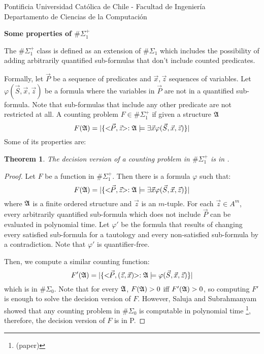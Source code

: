 \documentclass[12pt]{article}
\def\A{{\frak A}}
\newtheorem{theo}{Theorem}
\begin{document}
\begin{flushleft}
{\footnotesize Pontificia Universidad Cat\'olica de Chile - Facultad de Ingenier\'ia\\
Departamento de Ciencias de la Computaci\'on\\
}
\end{flushleft}
\begin{center}
{ \LARGE \bf
  Some properties of $\#\Sigma_1^{+}$
}
\end{center}

The $\#\Sigma_1^{+}$ class is defined as an extension of $\#\Sigma_1$ which includes the possibility of adding arbitrarily quantified sub-formulas that don't include counted predicates.

Formally, let $\vec{P}$ be a sequence of predicates and $\vec{x},\vec{z}$ sequences of variables. Let $\varphi(\vec{S},\vec{x},\vec{z})$ be a formula where the variables in $\vec{P}$ are not in a quantified sub-formula. Note that sub-formulas that include any other predicate are not restricted at all. A counting problem $F \in \#\Sigma_1^{+}$ if given a structure $\A$
$$
F(\A) = \vert \{ <\!\!\vec{P},\vec{z}\!\!> :\A \models \exists \vec{x} \varphi(\vec{S},\vec{x},\vec{z}) \} \vert
$$ 
Some of its properties are:

\begin{theo}
The decision version of a counting problem in $\#\Sigma_1^{+}$ is in .
\end{theo}
\begin{proof}
Let $F$ be a function in $\#\Sigma_1^{+}$. Then there is a formula $\varphi$ such that:
$$
F(\A) = \vert \{ <\!\!\vec{P},\vec{z}\!\!> :\A \models \exists \vec{x} \varphi(\vec{S},\vec{x},\vec{z}) \} \vert
$$ 
where $\A$ is a finite ordered structure and $\vec{z}$ is an $m$-tuple. For each $\vec{z} \in A^m$, every arbitrarily quantified sub-formula which does not include $\vec{P}$ can be evaluated in polynomial time. Let $\varphi'$ be the formula that results of changing every satisfied sub-formula for a tautology and every non-satisfied sub-formula by a contradiction. Note that $\varphi'$ is quantifier-free.

Then, we compute a similar counting function:
$$
F'(\A) = \vert \{ <\!\!\vec{P},(\vec{z},\vec{x})\!\!> :\A \models \varphi(\vec{S},\vec{x},\vec{z}) \} \vert
$$ 
which is in $\#\Sigma_0$. Note that for every $\A$, $F(\A) > 0$ iff $F'(\A) > 0$, so computing $F'$ is enough to solve the decision version of $F$. However, Saluja and Subrahmanyam showed that any counting problem in $\#\Sigma_0$ is computable in polynomial time \footnote[1]{(paper)}, therefore, the decision version of $F$ is in P.
\end{proof}
\end{document}
